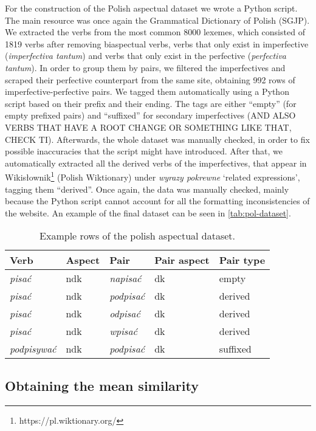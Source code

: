 \documentclass[12pt]{article}
\newcommand{\ita}[1]{\textit{#1}}
\begin{document}
For the construction of the Polish aspectual dataset we wrote a Python script. The main resource was once again the Grammatical Dictionary of Polish (SGJP). We extracted the verbs from the most common 8000 lexemes, which consisted of 1819 verbs after removing biaspectual verbs, verbs that only exist in imperfective (\textit{imperfectiva tantum}) and verbs that only exist in the perfective (\textit{perfectiva tantum}). In order to group them by pairs, we filtered the imperfectives and scraped their perfective counterpart from the same site, obtaining 992 rows of imperfective-perfective pairs. We tagged them automatically using a Python script based on their prefix and their ending. The tags are either \enquote{empty} (for empty prefixed pairs) and \enquote{suffixed} for secondary imperfectives (AND ALSO VERBS THAT HAVE A ROOT CHANGE OR SOMETHING LIKE THAT, CHECK TI). Afterwards, the whole dataset was manually checked, in order to fix possible inaccuracies that the script might have introduced. After that, we automatically extracted all the derived verbs of the imperfectives, that appear in Wikisłownik\footnote{https://pl.wiktionary.org/} (Polish Wiktionary) under \ita{wyrazy pokrewne} `related expressions', tagging them \enquote{derived}. Once again, the data was manually checked, mainly because the Python script cannot account for all the formatting inconsistencies of the website. An example of the final dataset can be seen in \autoref{tab:pol-dataset}.

\begin{table}[h!]
\centering
\small
\begin{tabular}{lllll}
    \toprule
    \textbf{Verb} & \textbf{Aspect} & \textbf{Pair} & \textbf{Pair aspect} & \textbf{Pair type} \\ 
    \midrule
    \textit{pisać}  & ndk &\textit{napisać} & dk & empty \\
    \textit{pisać}  & ndk  & \textit{podpisać} & dk & derived  \\
    \ita{pisać} & ndk  & \ita{odpisać} & dk & derived \\
    \ita{pisać} & ndk  & \ita{wpisać} & dk & derived \\
    \textit{podpisywać} & ndk  & \textit{podpisać} & dk & suffixed  \\
    \bottomrule
\end{tabular}
\caption{Example rows of the polish aspectual dataset.}
\label{tab:pol-dataset}
\end{table}

\subsection{Obtaining the mean similarity}
\end{document}
